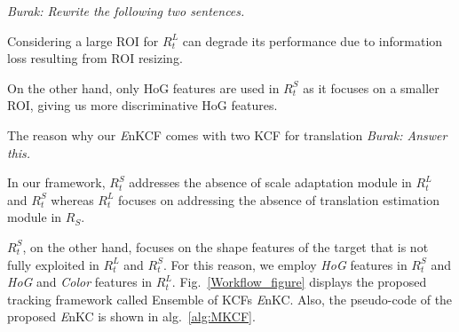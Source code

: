 \documentclass{bmvc2k}
\begin{document}
{\it Burak: Rewrite the following two sentences.}

Considering a large ROI for $R_{t}^{L}$ can degrade its performance
due to information loss resulting from ROI resizing.

On the other hand, only HoG features are used in $R_{t}^{S}$ as it
focuses on a smaller ROI, giving us more discriminative HoG
features. 

The reason why our {\it E}nKCF comes with two KCF for translation {\it
  Burak: Answer this.}

In our framework, $R_{t}^{S}$ addresses the absence of scale
adaptation module in $R_{t}^{L}$ and $R_{t}^{S}$ whereas $R_{t}^{L}$
focuses on addressing the absence of translation estimation module in
$R_{S}$. 


$R_{t}^{S}$, on the other hand, focuses on the shape features
of the target that is not fully exploited in $R_{t}^{L}$ and
$R_{t}^{S}$. For this reason, we employ \textit{HoG} features in
$R_{t}^{S}$ and \textit{HoG} and \textit{Color} features in
$R_{t}^{L}$. Fig.~\ref{Workflow_figure} displays the proposed tracking
framework called Ensemble of KCFs {\it E}nKC. Also, the pseudo-code of
the proposed {\it E}nKC is shown in alg.~\ref{alg:MKCF}.
\end{document}
